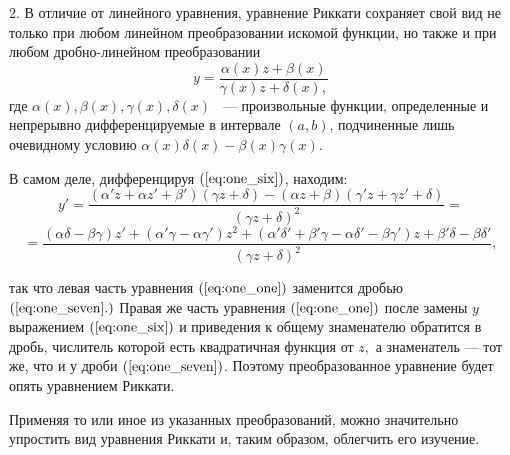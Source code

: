 $2.$ В отличие от линейного уравнения, уравнение Риккати сохраняет свой вид не только при любом линейном преобразовании искомой функции, но также и при любом дробно-линейном преобразовании
\begin{equation}  \label{eq:one_six}
    y = \dfrac{\alpha \left( x \right) z + \beta \left( x \right)}{\gamma \left( x \right) z + \delta \left( x \right),}
\end{equation}
где $\alpha \left( x \right), \beta \left( x \right), \gamma \left( x \right), \delta \left( x \right)$ ~--- произвольные функции, определенные и непрерывно дифференцируемые в интервале $\left( a, b \right)$, подчиненные лишь очевидному условию $\alpha \left( x \right) \delta \left( x \right) - \beta \left( x \right) \gamma \left( x \right).$

В самом деле, дифференцируя $\left( \ref{eq:one_six} \right)$, находим:
$$ 
    y' = \dfrac{\left( \alpha'z + \alpha z' + \beta' \right) \left( \gamma z + \delta \right) - \left( \alpha z + \beta \right) \left( \gamma' z + \gamma z' + \delta \right)}{\left( \gamma z + \delta \right)^2} =
$$
\begin{equation}  \label{eq:one_seven}
    = \dfrac{\left( \alpha \delta - \beta \gamma \right)z' + \left( \alpha' \gamma - \alpha \gamma' \right)z^{2} + \left( \alpha' \delta' + \beta' \gamma - \alpha \delta' - \beta \gamma' \right)z + \beta' \delta - \beta \delta'}{\left( \gamma z + \delta \right)^2},
\end{equation}



так что левая часть уравнения $\left( \ref{eq:one_one} \right)$ заменится дробью $ \left( \ref{eq:one_seven}. \right)$ Правая же часть уравнения $\left( \ref{eq:one_one} \right)$ после замены $y$ выражением $\left( \ref{eq:one_six} \right)$ и приведения к общему знаменателю обратится в дробь, числитель которой есть квадратичная функция от $z,$ а знаменатель --- тот же, что и у дроби $\left( \ref{eq:one_seven} \right)$. Поэтому преобразованное уравнение будет опять уравнением Риккати.

Применяя то или иное из указанных преобразований, можно значительно упростить вид уравнения Риккати и, таким образом, облегчить его изучение.

